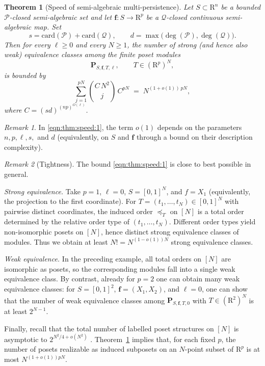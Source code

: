 \documentclass{amsart}[10pts]
\newtheorem{theorem}{Theorem}
\theoremstyle{definition}
\theoremstyle{remark}
\newtheorem{remark}{Remark}
\theoremstyle{observation}
\numberwithin{equation}{section}
\newcommand {\R} {\mathrm{R}}
\newcommand{\card}{\mathrm{card}}
\begin{document}
\begin{theorem}[Speed of semi-algebraic multi-persistence]
\label{thm:speed}
Let $S\subset \R^n$ be a bounded $\mathcal P$-closed semi-algebraic set and let $\mathbf f:S\to \R^p$ be a $\mathcal Q$-closed continuous semi-algebraic map.
Set
\[
s=\card(\mathcal P)+\card(\mathcal Q),
\qquad
d=\max\bigl(\deg(\mathcal P),\deg(\mathcal Q)\bigr).
\]
Then for every $\ell\ge 0$ and every $N\ge 1$, the number of \emph{strong} (and hence also \emph{weak}) equivalence classes among the finite poset modules
\[
\mathbf P_{S,\mathbf f,T,\ell},\qquad T\in (\R^p)^N,
\]
is bounded by
\begin{equation}
\label{eqn:thm:speed:1}
\sum_{j=1}^{pN} \binom{C\,N^{2}}{j}\, C^{pN}
\;=\;
N^{(1+o(1))\,pN},
\end{equation}
where $C=(sd)^{(np)^{O(\ell)}}$.
\end{theorem}

\begin{remark}
\label{rem:speed:o1}
In \eqref{eqn:thm:speed:1}, the term $o(1)$ depends on the parameters $n,p,\ell,s,$ and $d$ (equivalently, on $S$ and $\mathbf f$ through a bound on their description complexity).
\end{remark}

\begin{remark}[Tightness]
\label{rem:tight}
The bound \eqref{eqn:thm:speed:1} is close to best possible in general.

\smallskip\noindent
\emph{Strong equivalence.}
Take $p=1$, $\ell=0$, $S=[0,1]^N$, and $f=X_1$ (equivalently, the projection to the first coordinate).
For $T=(t_1,\ldots,t_N)\in [0,1]^N$ with pairwise distinct coordinates, the induced order $\preceq_T$ on $[N]$ is a total order determined by the relative order type of $(t_1,\ldots,t_N)$.
Different order types yield non-isomorphic posets on $[N]$, hence distinct strong equivalence classes of modules. 
Thus we obtain at least $N!=N^{(1-o(1))N}$ strong equivalence classes.

\smallskip\noindent
\emph{Weak equivalence.}
In the preceding example, all total orders on $[N]$ are isomorphic as posets, so the corresponding modules fall into a single weak equivalence class.
By contrast, already for $p=2$ one can obtain many weak equivalence classes: for $S=[0,1]^2$, $\mathbf f=(X_1,X_2)$, and $\ell=0$, one can show that the number of weak equivalence classes among $\mathbf P_{S,\mathbf f,T,0}$ with $T\in (\R^2)^N$ is at least $2^{N-1}$.

\smallskip\noindent
Finally, recall that the total number of labelled poset structures on $[N]$ is asymptotic to $2^{N^2/4+o(N^2)}$ \cite{KR70}. 
Theorem~\ref{thm:speed} implies that, for each fixed $p$, the number of posets realizable as induced subposets on an $N$-point subset of $\R^p$ is at most $N^{(1+o(1))pN}$.
\end{remark}
\end{document}
